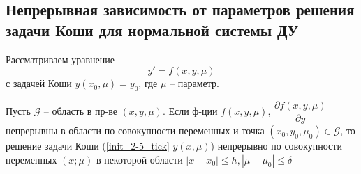\subsection{Непрерывная зависимость от параметров решения задачи Коши для нормальной системы ДУ}
    Рассматриваем уравнение
    \begin{equation}\label{init_2-5_tick}
    y' = f(x, y, \mu)
    \end{equation}
    с задачей Коши $y(x_0, \mu) = y_0$, где $\mu$ -- параметр.
\begin{theorem}
    Пусть $\mathcal{G}$ -- область в пр-ве $(x, y, \mu)$. Если ф-ции $f(x, y, \mu)$, $\dfrac{\partial f(x, y, \mu)}{\partial y}$ непрерывны в области по совокупности переменных и точка $(x_0, y_0, \mu_0) \in \mathcal{G}$, то решение задачи Коши (\ref{init_2-5_tick} $y(x, \mu)$) непрерывно по совокупности переменных $(x; \mu)$ в некоторой области $|x - x_0| \leqslant h, |\mu - \mu_0| \leqslant \delta$
\end{theorem}
